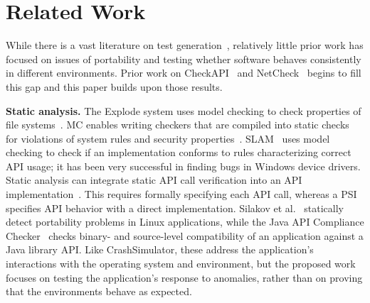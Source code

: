 \section{Related Work} \label{sec:related}

While there is a vast literature on test
generation~\cite{ammann2008introduction, mcminn2004search,
  puasuareanu2009survey, dias2007survey}, relatively little prior work
has focused on issues of portability and testing whether software
behaves consistently in different environments.  Prior work on
CheckAPI~\cite{rasley2015detecting} and
NetCheck~\cite{Zhuang_NSDI_2014} begins to fill this gap and this paper
builds upon those results.
%
%

\noindent
{\bf Static analysis. }
The Explode system uses model checking to check properties 
of file systems~\cite{Yang:2006:ELG:1298455.1298469}.
MC enables writing checkers that are compiled into
static checks for violations of system rules and security 
properties~\cite{Engler:2000:CSR:1251229.1251230, Ashcraft02usingprogrammer-written}.
SLAM~\cite{Ball_adecade, Ball:2002:SLP:503272.503274} 
uses model checking to check if an implementation
conforms to rules characterizing correct API usage;
it has been very successful in finding bugs
in Windows device drivers.
Static analysis can integrate static API call verification into an API
implementation~\cite{spinellis2007framework}. This requires formally specifying each API call, whereas
a PSI specifies API behavior with a direct implementation. Silakov et
al.~\cite{silakov2010improving} statically detect portability problems
in Linux applications, while the Java API Compliance
Checker~\cite{javacompliance-www}
checks binary- and source-level compatibility of an application against
a Java library API. 
Like CrashSimulator, these address the application's
interactions with the operating system and environment,
but the proposed work focuses on testing the application's
response to anomalies, rather than on proving that the
environments behave as expected.


